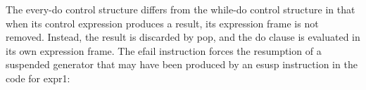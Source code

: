 \begin{center}
\tabletail{}
\tablelasttail{}
\begin{supertabular}{|m{1.9073598in}|m{2.75596in}|}

\end{supertabular}
\end{center}

The every-do control structure differs from the while-do control
structure in that when its control expression produces a result, its
expression frame is not removed. Instead, the result is discarded by
pop, and the do clause is evaluated in its own expression frame. The
efail instruction forces the resumption of a suspended generator that
may have been produced by an esusp instruction in the code for expr1:

